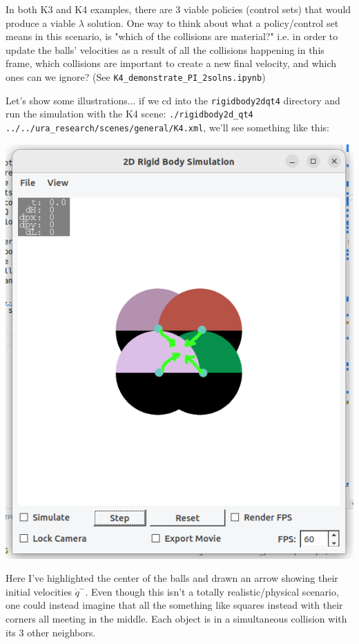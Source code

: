 \documentclass[12pt]{article}
\begin{document}
In both K3 and K4 examples, there are 3 viable policies (control sets) that would produce a viable $\lambda$ solution.
One way to think about what a policy/control set means in this scenario,
is "which of the collisions are material?"
i.e. in order to update the balls' velocities as a result of all the collisions happening in this frame,
which collisions are important to create a new final velocity, and which ones can we ignore?
(See \texttt{K4\_demonstrate\_PI\_2solns.ipynb})

Let's show some illustrations... if we cd into the \texttt{rigidbody2dqt4} directory and
run the simulation with the K4 scene: \texttt{./rigidbody2d\_qt4 ../../ura\_research/scenes/general/K4.xml},
we'll see something like this:

\includegraphics[scale=0.5]{K4_1}

Here I've highlighted the center of the balls and drawn an arrow showing their initial velocities $\dot q^-$.
Even though this isn't a totally realistic/physical scenario, one could instead imagine that all the
something like squares instead with their corners all meeting in the middle. Each object is in 
a simultaneous collision with its 3 other neighbors.
\end{document}
